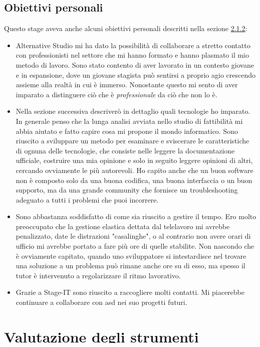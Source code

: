 \subsection{Obiettivi personali}
Questo stage aveva anche alcuni obiettivi personali descritti nella sezione \hyperref[sec:obiettivi-pers]{2.1.2}:
\begin{itemize}
    \item Alternative Studio mi ha dato la possibilità di collaborare a stretto contatto con professionisti nel settore che mi hanno formato
    e hanno plasmato il mio metodo di lavoro. Sono stato contento di aver lavorato in un contesto giovane e in espansione, dove un giovane
    stagista può sentirsi a proprio agio crescendo assieme alla realtà in cui è immerso. Nonostante questo mi sento di aver imparato a
    distinguere ciò che è \textit{professionale} da ciò che non lo è.
    \item Nella sezione successiva descriverò in dettaglio quali tecnologie ho imparato. In generale penso che la lunga analisi avviata
    nello studio di fattibilità mi abbia aiutato e fatto capire cosa mi propone il mondo informatico. Sono riuscito a sviluppare un metodo
    per esaminare e sviscerare le caratteristiche di ognuna delle tecnologie, che consiste nelle leggere la documentazione ufficiale,
    costruire una mia opinione e solo in seguito leggere opinioni di altri, cercando ovviamente le più autorevoli. Ho capito anche che un
    buon software non è composto solo da una buona codifica, una buona interfaccia o un buon supporto, ma da una grande community che
    fornisce un troubleshooting adeguato a tutti i problemi che puoi incorrere.
    \item Sono abbastanza soddisfatto di come sia riuscito a gestire il tempo. Ero molto preoccupato che la gestione elastica dettata dal
    telelavoro mi avrebbe penalizzato, date le distrazioni "casalinghe", o al contrario non avere orari di ufficio mi avrebbe portato a fare
    più ore di quelle stabilite. Non nascondo che è ovviamente capitato, quando uno sviluppatore si intestardisce nel trovare una
    soluzione a un problema può rimane anche ore su di esso, ma spesso il tutor è intervenuto a regolarizzare il ritmo lavorativo. 
    \item Grazie a Stage-IT sono riuscito a raccogliere molti contatti. Mi piacerebbe continuare a collaborare con \acrlong{asd} nei suo
    progetti futuri.
\end{itemize}

\section{Valutazione degli strumenti utilizzati}

